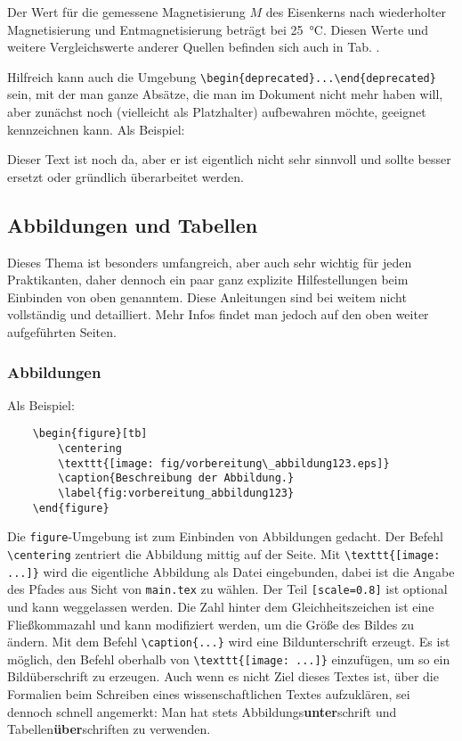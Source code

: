 Der Wert für die gemessene Magnetisierung $M$ des Eisenkerns nach wiederholter Magnetisierung und Entmagnetisierung beträgt  bei \SI{25}{\celsius}. Diesen Werte und weitere Vergleichswerte anderer Quellen befinden sich auch in Tab. .

Hilfreich kann auch die Umgebung \verb|\begin{deprecated}...\end{deprecated}| sein, mit der man ganze Absätze, die man im Dokument nicht mehr haben will, aber zunächst noch (vielleicht als Platzhalter) aufbewahren möchte, geeignet kennzeichnen kann. Als Beispiel:

\begin{deprecated}
Dieser Text ist noch da, aber er ist eigentlich nicht sehr sinnvoll und sollte besser ersetzt oder gründlich überarbeitet werden.
\end{deprecated}

\subsection{Abbildungen und Tabellen}
Dieses Thema ist besonders umfangreich, aber auch sehr wichtig für jeden Praktikanten, daher dennoch ein paar ganz explizite Hilfestellungen beim Einbinden von oben genanntem. Diese Anleitungen sind bei weitem nicht vollständig und detailliert. Mehr Infos findet man jedoch auf den oben weiter aufgeführten Seiten.

\subsubsection{Abbildungen}
Als Beispiel:
\begin{verbatim}
	\begin{figure}[tb]
	    \centering
	    \texttt{[image: fig/vorbereitung\_abbildung123.eps]}
	    \caption{Beschreibung der Abbildung.}
	    \label{fig:vorbereitung_abbildung123}
	\end{figure}
\end{verbatim}
Die \verb|figure|-Umgebung ist zum Einbinden von Abbildungen gedacht. Der Befehl \verb|\centering| zentriert die Abbildung mittig auf der Seite. Mit \verb|\texttt{[image: ...]}| wird die eigentliche Abbildung als Datei eingebunden, dabei ist die Angabe des Pfades aus Sicht von \verb|main.tex| zu wählen. Der Teil \verb|[scale=0.8]| ist optional und kann weggelassen werden. Die Zahl hinter dem Gleichheitszeichen ist eine Fließkommazahl und kann modifiziert werden, um die Größe des Bildes zu ändern. Mit dem Befehl \verb|\caption{...}| wird eine Bildunterschrift erzeugt. Es ist möglich, den Befehl oberhalb von \verb|\texttt{[image: ...]}| einzufügen, um so ein Bildüberschrift zu erzeugen. Auch wenn es nicht Ziel dieses Textes ist, über die Formalien beim Schreiben eines wissenschaftlichen Textes aufzuklären, sei dennoch schnell angemerkt: Man hat stets Abbildungs\textbf{unter}schrift und Tabellen\textbf{über}schriften zu verwenden.

